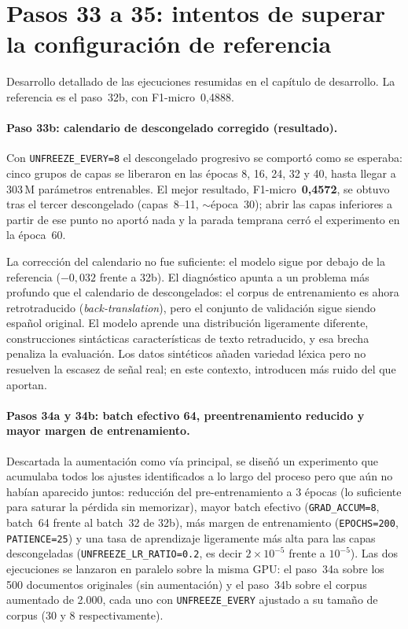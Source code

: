 \section{Pasos 33 a 35: intentos de superar la configuración de referencia}
\label{sec:anexoF-pasos3335}

Desarrollo detallado de las ejecuciones resumidas en el capítulo de desarrollo. La referencia es el paso~32b, con F1-micro~0,4888.

\paragraph{Paso 33b: calendario de descongelado corregido (resultado).}
Con \texttt{UNFREEZE\_EVERY=8} el descongelado progresivo se comportó como se esperaba: cinco grupos de capas se liberaron en las épocas 8, 16, 24, 32 y 40, hasta llegar a 303\,M parámetros entrenables. El mejor resultado, F1-micro~\textbf{0,4572}, se obtuvo tras el tercer descongelado (capas~8--11, $\sim$época~30); abrir las capas inferiores a partir de ese punto no aportó nada y la parada temprana cerró el experimento en la época~60.

La corrección del calendario no fue suficiente: el modelo sigue por debajo de la referencia ($-0{,}032$ frente a 32b). El diagnóstico apunta a un problema más profundo que el calendario de descongelados: el corpus de entrenamiento es ahora retrotraducido (\emph{back-translation}), pero el conjunto de validación sigue siendo español original. El modelo aprende una distribución ligeramente diferente, construcciones sintácticas características de texto retraducido, y esa brecha penaliza la evaluación. Los datos sintéticos añaden variedad léxica pero no resuelven la escasez de señal real; en este contexto, introducen más ruido del que aportan.

\paragraph{Pasos 34a y 34b: batch efectivo 64, preentrenamiento reducido y mayor margen de entrenamiento.}
\begin{sloppypar}
Descartada la aumentación como vía principal, se diseñó un experimento que acumulaba todos los ajustes identificados a lo largo del proceso pero que aún no habían aparecido juntos: reducción del pre-entrenamiento a 3 épocas (lo suficiente para saturar la pérdida sin memorizar), mayor batch efectivo (\texttt{GRAD\_ACCUM=8}, batch~64 frente al batch~32 de 32b), más margen de entrenamiento (\texttt{EPOCHS=200}, \texttt{PATIENCE=25}) y una tasa de aprendizaje ligeramente más alta para las capas descongeladas (\texttt{UNFREEZE\_LR\_RATIO=0.2}, es decir $2\times10^{-5}$ frente a $10^{-5}$). Las dos ejecuciones se lanzaron en paralelo sobre la misma GPU: el paso~34a sobre los 500 documentos originales (sin aumentación) y el paso~34b sobre el corpus aumentado de 2.000, cada uno con \texttt{UNFREEZE\_EVERY} ajustado a su tamaño de corpus (30 y 8 respectivamente).
\end{sloppypar}

